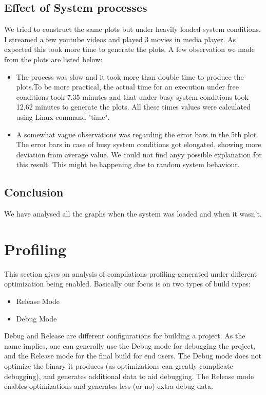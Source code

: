 \documentclass[11pt]{article}
\begin{document}
\subsection{Effect of System processes}
We tried to construct the same plots but under heavily loaded system conditions. I streamed a few youtube videos and played 3 movies in media player. As expected this took more time to generate the plots. A few observation we made from the plots are listed below:

\begin{itemize}
\item The process was slow and it took more than double time to produce the plots.To be more practical, the actual time for an execution under free conditions took 7.35 minutes and that under busy system conditions took 12.62 minutes to generate the plots.
All these times values were calculated using Linux command "time".
\item A somewhat vague observations was regarding the error bars in the 5th plot. The error bars in case of busy system conditions got elongated, showing more deviation from average value. We could not find anyy possible explanation for this result. This might be happening due to random system behaviour.
\end{itemize}

\subsection{Conclusion}

We have analysed all the graphs when the system was loaded and when it wasn't.

\section{Profiling}
This section gives an analysis of compilations profiling generated under different optimization being enabled. Basically our focus is on two types of build types:
\begin{itemize}
\item Release Mode
\item Debug Mode
\end{itemize}

Debug and Release are different configurations for building a project. As the name implies, one can generally use the Debug mode for debugging the project, and the Release mode for the final build for end users. The Debug mode does not optimize the binary it produces (as optimizations can greatly complicate debugging), and generates additional data to aid debugging. The Release mode enables optimizations and generates less (or no) extra debug data.
\end{document}
